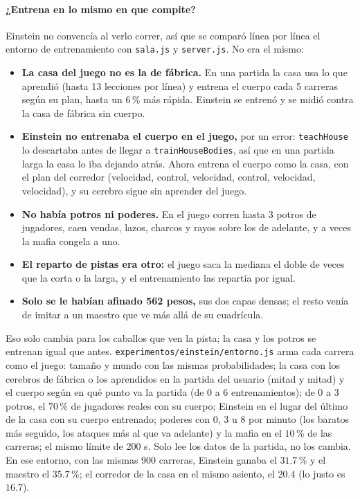 \documentclass[11pt,letterpaper]{article}
\begin{document}
\paragraph{¿Entrena en lo mismo en que compite?} Einstein no convencía al verlo correr, así que se comparó línea por línea el entorno de entrenamiento con \texttt{sala.js} y \texttt{server.js}. No era el mismo:
\begin{itemize}
\item \textbf{La casa del juego no es la de fábrica.} En una partida la casa usa lo que aprendió (hasta 13 lecciones por línea) y entrena el cuerpo cada 5 carreras según su plan, hasta un $6$\,\% más rápida. Einstein se entrenó y se midió contra la casa de fábrica sin cuerpo.
\item \textbf{Einstein no entrenaba el cuerpo en el juego,} por un error: \texttt{teachHouse} lo descartaba antes de llegar a \texttt{trainHouseBodies}, así que en una partida larga la casa lo iba dejando atrás. Ahora entrena el cuerpo como la casa, con el plan del corredor (velocidad, control, velocidad, control, velocidad, velocidad), y su cerebro sigue sin aprender del juego.
\item \textbf{No había potros ni poderes.} En el juego corren hasta 3 potros de jugadores, caen vendas, lazos, charcos y rayos sobre los de adelante, y a veces la mafia congela a uno.
\item \textbf{El reparto de pistas era otro:} el juego saca la mediana el doble de veces que la corta o la larga, y el entrenamiento las repartía por igual.
\item \textbf{Solo se le habían afinado 562 pesos,} sus dos capas densas; el resto venía de imitar a un maestro que ve más allá de su cuadrícula.
\end{itemize}
Eso solo cambia para los caballos que ven la pista; la casa y los potros se entrenan igual que antes. \texttt{experimentos/einstein/entorno.js} arma cada carrera como el juego: tamaño y mundo con las mismas probabilidades; la casa con los cerebros de fábrica o los aprendidos en la partida del usuario (mitad y mitad) y el cuerpo según en qué punto va la partida (de 0 a 6 entrenamientos); de 0 a 3 potros, el $70$\,\% de jugadores reales con su cuerpo; Einstein en el lugar del último de la casa con su cuerpo entrenado; poderes con 0, 3 u 8 por minuto (los baratos más seguido, los ataques más al que va adelante) y la mafia en el $10$\,\% de las carreras; el mismo límite de 200 s. Solo lee los datos de la partida, no los cambia. En ese entorno, con las mismas 900 carreras, Einstein ganaba el $31.7$\,\% y el maestro el $35.7$\,\%; el corredor de la casa en el mismo asiento, el $20.4$ (lo justo es $16.7$).
\end{document}
